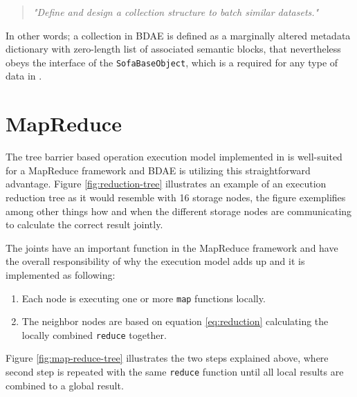 \begin{quotation}
	\textit{"Define and design a collection structure to batch similar datasets."}
\end{quotation}

In other words; a collection in BDAE is defined as a marginally altered metadata dictionary with zero-length list of associated semantic blocks, that nevertheless obeys the interface of the \texttt{SofaBaseObject}, which is a required for any type of data in \CodeName.

\section{MapReduce}
The tree barrier based operation execution model implemented in \CodeName is well-suited for a MapReduce framework and BDAE is utilizing this straightforward advantage. Figure \ref{fig:reduction-tree} illustrates an example of an execution reduction tree as it would resemble with 16 storage nodes, the figure exemplifies among other things how and when the different storage nodes are communicating to calculate the correct result jointly.
\newline

The joints have an important function in the MapReduce framework and have the overall responsibility of why the execution model adds up and it is implemented as following:
\begin{enumerate}
	\item Each node is executing one or more \texttt{map} functions locally.
	\item The neighbor nodes are based on equation \ref{eq:reduction} calculating the locally combined \texttt{reduce} together.
\end{enumerate}

Figure \ref{fig:map-reduce-tree} illustrates the two steps explained above, where second step is repeated with the same \texttt{reduce} function until all local results are combined to a global result.

